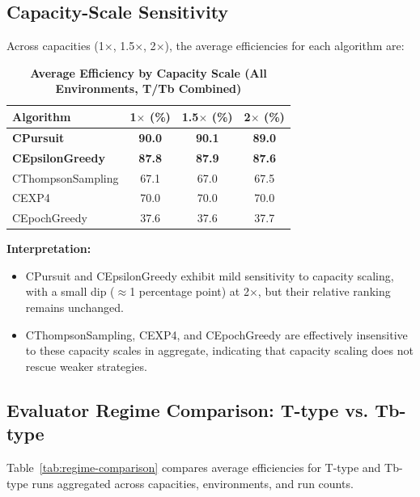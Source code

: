 \documentclass[12pt,a4paper]{article}
\newcommand{\performance}[1]{\textcolor{performancecolor}{\textbf{#1}}}
\begin{document}
\subsection{Capacity-Scale Sensitivity}

Across capacities (1$\times$, 1.5$\times$, 2$\times$), the average efficiencies for each algorithm are:

\begin{table}[H]
\centering
\caption{\performance{Average Efficiency by Capacity Scale (All Environments, T/Tb Combined)}}
\begin{tabular}{|l|c|c|c|}
\hline
\textbf{Algorithm} & \textbf{1$\times$ (\%)} & \textbf{1.5$\times$ (\%)} & \textbf{2$\times$ (\%)} \\
\hline
\hline
\performance{CPursuit}        & \performance{90.0} & \performance{90.1} & \performance{89.0} \\
\performance{CEpsilonGreedy} & \performance{87.8} & \performance{87.9} & \performance{87.6} \\
CThompsonSampling            & 67.1              & 67.0              & 67.5 \\
CEXP4                        & 70.0              & 70.0              & 70.0 \\
CEpochGreedy                 & 37.6              & 37.6              & 37.7 \\
\hline
\end{tabular}
\end{table}

\textbf{Interpretation:}
\begin{itemize}
\item CPursuit and CEpsilonGreedy exhibit mild sensitivity to capacity scaling, with a small dip ($\approx$1 percentage point) at 2$\times$, but their relative ranking remains unchanged.
\item CThompsonSampling, CEXP4, and CEpochGreedy are effectively insensitive to these capacity scales in aggregate, indicating that capacity scaling does not rescue weaker strategies.
\end{itemize}

\subsection{Evaluator Regime Comparison: T-type vs. Tb-type}

Table~\ref{tab:regime-comparison} compares average efficiencies for T-type and Tb-type runs aggregated across capacities, environments, and run counts.
\end{document}
